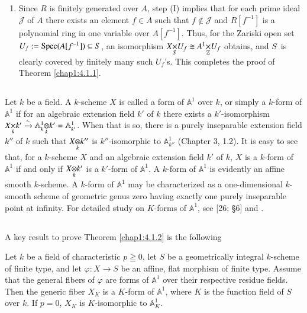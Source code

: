 \begin{proofoftheorem*}[4.1.1 ]
\begin{enumerate}
\item Since $R$ is finitely generated over $A$, step (I) implies that
  for each prime ideal $\mathscr{J}$ of $A$ there exists an element
  $f\in A$ such that $f\not\in \mathscr{J}$ and $R[f^{-1}]$ is a
  polynomial ring in one variable over $A[f^{-1}]$. Thus, for the
  Zariski open set $U_{f}:=\operatorname{Spec}(A[f^{-1}])\subseteq S$, an
  isomorphism $\fprod{X}{U_{f}}{S}\cong
  \fprod{A^{1}}{U_{f}}{\mathbb{Z}}$ obtains, and $S$\pageoriginale\ is
  clearly covered by finitely many such $U_{f}$'s. This completes the
  proof of Theorem \ref{chap1:4.1.1}.
\end{enumerate}
\end{proofoftheorem*}

\setcounter{subsection}{5}
\subsection{}\label{chap1:4.6}

Let $k$ be a field. A $k$-scheme $X$ is called a form of
$\mathbb{A}^{1}$ over $k$, or simply a $k$-form of $\mathbb{A}^{1}$ if
for an algebraic extension field $k'$ of $k$ there exists a
$k'$-isomorphism $\fprod{X}{k'}{k}\xrightarrow{\sim}
\foprod{\mathbb{A}^{1}_{k}}{k'}{k}=\mathbb{A}^{1}_{k'}$. When that is
so, there is a purely inseparable extension field $k''$ of $k$ such
that $\foprod{X}{k''}{k}$ is $k''$-isomorphic to
$\mathbb{A}^{1}_{k''}$ (\cf Chapter 3, 1.2). It is easy to see that,
for a $k$-scheme $X$ and an algebraic extension field $k'$ of $k$, $X$
is a $k$-form of $\mathbb{A}^{1}$ if and only if $\foprod{X}{k'}{k}$
is a $k'$-form of $\mathbb{A}^{1}$. A $k$-form of $\mathbb{A}^{1}$ is
evidently an affine smooth $k$-scheme. A $k$-form of $\mathbb{A}^{1}$
may be characterized as a one-dimensional $k$-smooth scheme of
geometric genus zero having exactly one purely inseparable point at
infinity. For detailed study on $K$-forms of $\mathbb{A}^{1}$, see
[26; \S 6] and \cite{27}. 

\subsection{}\label{chap1:4.7}
A key result to prove Theorem \ref{chap1:4.1.2} is the following

\begin{lemma*}
Let $k$ be a field of characteristic $p\geqq 0$, let $S$ be a
geometrically integral $k$-scheme of finite type, and let
$\varphi:X\to S$ be an affine, flat morphism of finite type. Assume
that the general flbers of $\varphi$ are forms of $\mathbb{A}^{1}$
over their respective residue fields. Then the generic fiber $X_{K}$
is a $K$-form of $\mathbb{A}^{1}$, where $K$ is the function field of
$S$ over $k$. If $p=0$, $X_{K}$ is $K$-isomorphic to
$\mathbb{A}^{1}_{K}$. 
\end{lemma*}

